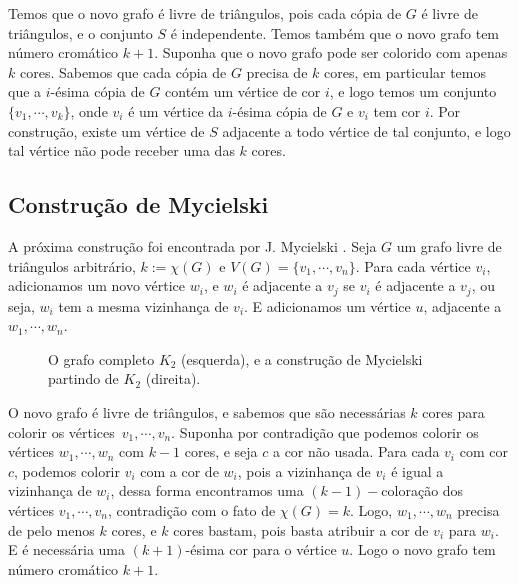 Temos que o novo grafo é livre de triângulos, pois cada cópia de $G$ é livre de triângulos, e o conjunto $S$ é independente. Temos também que o novo grafo tem número cromático $k+1$. Suponha que o novo grafo pode ser colorido com apenas $k$ cores. Sabemos que cada cópia de $G$ precisa de $k$ cores, em particular temos que a $i$-ésima cópia de $G$ contém um vértice de cor $i$, e logo temos um conjunto $\{v_1,\cdots,v_k\}$, onde $v_i$ é um vértice da $i$-ésima cópia de $G$ e $v_i$ tem cor $i$. Por construção, existe um vértice de $S$ adjacente a todo vértice de tal conjunto, e logo tal vértice não pode receber uma das $k$ cores.

\subsection{Construção de Mycielski}

A próxima construção foi encontrada por J. Mycielski \cite{mycielski1955coloriage}. Seja $G$ um grafo livre de triângulos arbitrário, $k := \chi(G)$ e $V(G) = \{v_1, \cdots, v_n\}$. Para cada vértice $v_i$, adicionamos um novo vértice $w_i$, e $w_i$ é adjacente a $v_j$ se $v_i$ é adjacente a $v_j$, ou seja, $w_i$ tem a mesma vizinhança de $v_i$. E adicionamos um vértice $u$, adjacente a $w_1, \cdots, w_n$.

\begin{figure}[H]
\centering
{}
\caption{O grafo completo $K_2$ (esquerda), e a construção de Mycielski partindo de $K_2$ (direita).}
\label{fig:mycielskiexample}
\end{figure}

O novo grafo é livre de triângulos, e sabemos que são necessárias $k$ cores para colorir os vértices~$v_1, \cdots, v_n$. Suponha por contradição que podemos colorir os vértices $w_1,\cdots, w_n$ com $k-1$ cores, e seja $c$ a cor não usada. Para cada $v_i$ com cor $c$, podemos colorir $v_i$ com a cor de $w_i$, pois a vizinhança de $v_i$ é igual a vizinhança de $w_i$, dessa forma encontramos uma $(k-1)-$coloração dos vértices $v_1,\cdots,v_n$, contradição com o fato de $\chi(G) = k$. Logo, $w_1,\cdots,w_n$ precisa de pelo menos $k$ cores, e $k$ cores bastam, pois basta atribuir a cor de $v_i$ para $w_i$. E é necessária uma $(k+1)$-ésima cor para o vértice $u$. Logo o novo grafo tem número cromático $k+1$.

